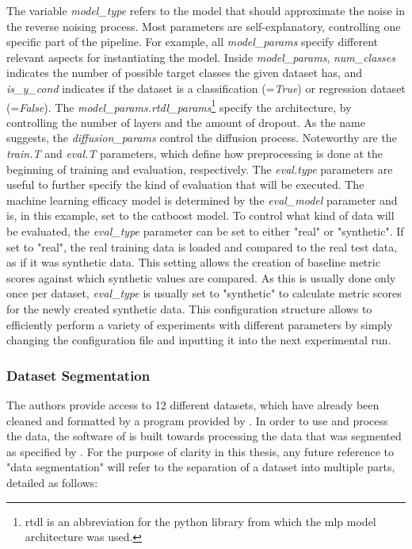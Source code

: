The variable \textit{model\_type} refers to the model that should approximate the noise in the reverse noising process.
Most parameters are self-explanatory, controlling one specific part of the pipeline.
For example, all \textit{model\_params} specify different relevant aspects for instantiating the model.
Inside \textit{model\_params}, \textit{num\_classes} indicates the number of possible target classes the given dataset has, and \textit{is\_y\_cond} indicates if the dataset is a classification (=\textit{True}) or regression dataset (=\textit{False}).
The \textit{model\_params.rtdl\_params}\footnote{rtdl is an abbreviation for the python library \cite{gorishniy2021RevisitingDeepLearning} from which the \gls{mlp} model architecture was used.} specify the  architecture, by controlling the number of layers and the amount of dropout.
As the name suggests, the \textit{diffusion\_params} control the diffusion process.
Noteworthy are the \textit{train.T} and \textit{eval.T} parameters, which define how preprocessing is done at the beginning of training and evaluation, respectively.
The \textit{eval.type} parameters are useful to further specify the kind of evaluation that will be executed.
The machine learning efficacy model is determined by the \textit{eval\_model} parameter and is, in this example, set to the catboost model.
To control what kind of data will be evaluated, the \textit{eval\_type} parameter can be set to either "real" or "synthetic".
If set to "real", the real training data is loaded and compared to the real test data, as if it was synthetic data.
This setting allows the creation of baseline metric scores against which synthetic values are compared.
As this is usually done only once per dataset, \textit{eval\_type} is usually set to "synthetic" to calculate metric scores for the newly created synthetic data.
This configuration structure allows to efficiently perform a variety of experiments with different parameters by simply changing the configuration file and inputting it into the next experimental run.

\subsubsection[]{Dataset Segmentation}
\label{sec:data_format}
The authors provide access to 12 different datasets, which have already been cleaned and formatted by a program provided by \textcite{gorishniy2023EmbeddingsNumericalFeatures}.
In order to use and process the data, the software of \cite{kotelnikov2022TabDDPMModellingTabular} is built towards processing the data that was segmented as specified by \textcite{gorishniy2023EmbeddingsNumericalFeatures}.
For the purpose of clarity in this thesis, any future reference to "data segmentation" will refer to the separation of a dataset into multiple parts, detailed as follows:

